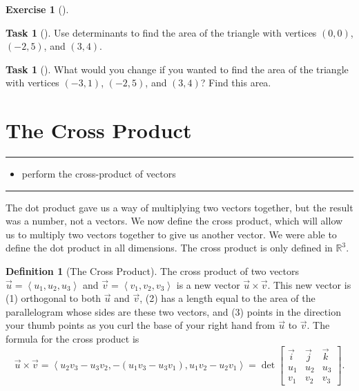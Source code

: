 \documentclass[10pt,]{book}
\theoremstyle{plain}
\theoremstyle{definition}
\newtheorem{definition}[theorem]{Definition}
\theoremstyle{definition}
\theoremstyle{definition}
\theoremstyle{definition}
\newtheorem{exploration}[project]{Exercise}
\newtheorem{task}[project]{Task}
\newenvironment{objectives}[1]{\noindent\rule{\linewidth}{0.1ex}\newline{\textbf{{\large#1}}\par\smallskip}}{\par\noindent\rule{\linewidth}{0.1ex}\par\smallskip}
\theoremstyle{definition}
\numberwithin{equation}{section}
\newcommand{\lt}{<}
\newcommand{\amp}{&}
\begin{document}
\begin{exploration}[]\label{exploration-40}
\begin{task}[]\label{task-72}
Use determinants to find the area of the triangle with vertices \((0,0)\), \((-2,5)\), and \((3,4)\).%
\end{task}
\begin{task}[]\label{task-73}
What would you change if you wanted to find the area of the triangle with vertices \((-3,1)\), \((-2,5)\), and \((3,4)\)? Find this area.%
\end{task}
\end{exploration}
\typeout{************************************************}
\typeout{************************************************}
\section[{The Cross Product}]{The Cross Product}\label{ch02_4_crossproduct}
\begin{objectives}{Objectives: Topical}\label{objectives-5}
%
\begin{itemize}[label=\textbullet]
\item{}perform the cross-product of vectors%
\end{itemize}
\end{objectives}
The dot product gave us a way of multiplying two vectors together, but the result was a number, not a vectors. We now define the cross product, which will allow us to multiply two vectors together to give us another vector. We were able to define the dot product in all dimensions. The cross product is only defined in \(\mathbb{R}^3\).%
\begin{definition}[{The Cross Product}]\label{cross_def}
The cross product of two vectors \(\vec u = \left\lt u_1,u_2,u_3\right>\) and \(\vec v = \left\lt v_1,v_2,v_3\right>\) is a new vector \(\vec u\times \vec v\). This new vector is (1) orthogonal to both \(\vec u\) and \(\vec v\), (2) has a length equal to the area of the parallelogram whose sides are these two vectors, and (3) points in the direction your thumb points as you curl the base of your right hand from \(\vec u\) to \(\vec v\). The formula for the cross product is%
\begin{equation*}
\vec u\times \vec v = \left\lt u_2v_3-u_3v_2,-(u_1v_3-u_3v_1),u_1v_2-u_2v_1\right> = \det\begin{bmatrix}\vec i \amp  \vec j\amp \vec k\\ u_1\amp u_2\amp u_3\\ v_1\amp v_2\amp v_3
\end{bmatrix} .
\end{equation*}
%
\end{definition}
\typeout{************************************************}
\typeout{************************************************}
\end{document}
